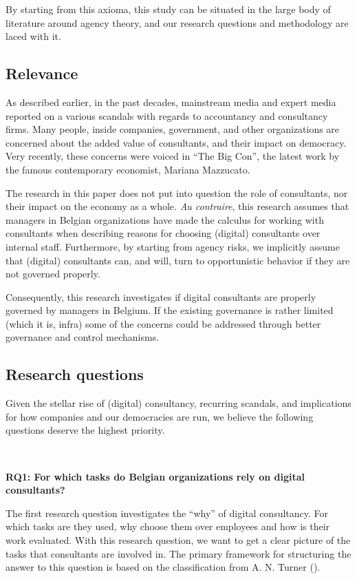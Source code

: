 \documentclass[
  man,floatsintext]{apa6}
\begin{document}
By starting from this axioma, this study can be situated in the large body of literature around agency theory, and our research questions and methodology are laced with it.

\subsection{Relevance}\label{relevance}

As described earlier, in the past decades, mainstream media and expert media reported on a various scandals with regards to accountancy and consultancy firms. Many people, inside companies, government, and other organizations are concerned about the added value of consultants, and their impact on democracy. Very recently, these concerns were voiced in ``The Big Con'', the latest work by the famous contemporary economist, Mariana Mazzucato.

The research in this paper does not put into question the role of consultants, nor their impact on the economy as a whole. \emph{Au contraire}, this research assumes that managers in Belgian organizations have made the calculus for working with consultants when describing reasons for choosing (digital) consultants over internal staff. Furthermore, by starting from agency risks, we implicitly assume that (digital) consultants can, and will, turn to opportunistic behavior if they are not governed properly.

Consequently, this research investigates if digital consultants are properly governed by managers in Belgium. If the existing governance is rather limited (which it is, infra) some of the concerns could be addressed through better governance and control mechanisms.

\subsection{Research questions}\label{research-questions}

Given the stellar rise of (digital) consultancy, recurring scandals, and implications for how companies and our democracies are run, we believe the following questions deserve the highest priority.

\(~\)

\textbf{RQ1: For which tasks do Belgian organizations rely on digital consultants?}

The first research question investigates the ``why'' of digital consultancy. For which tasks are they used, why choose them over employees and how is their work evaluated. With this research question, we want to get a clear picture of the tasks that consultants are involved in. The primary framework for structuring the answer to this question is based on the classification from A. N. Turner ().
\end{document}
